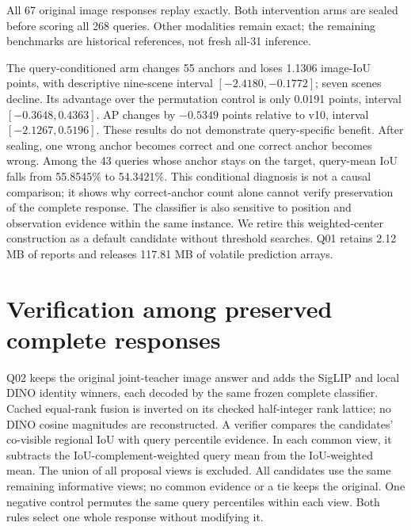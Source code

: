 \documentclass[10pt]{article}
\begin{document}
All 67 original image responses replay exactly. Both intervention arms are
sealed before scoring all 268 queries. Other modalities remain exact; the
remaining benchmarks are historical references, not fresh all-31 inference.
\begin{table}[ht]
\centering\small

\caption{Q01: targeted identity-conditioning control on the opened development
cohort. No arm is promoted. Actual selections are re-evaluated.}
\end{table}

The query-conditioned arm changes 55 anchors and loses 1.1306 image-IoU points,
with descriptive nine-scene interval $[-2.4180,-0.1772]$; seven scenes decline.
Its advantage over the permutation control is only 0.0191 points, interval
$[-0.3648,0.4363]$. AP changes by $-0.5349$ points relative to v10, interval
$[-2.1267,0.5196]$. These results do not demonstrate query-specific benefit.
After sealing, one wrong anchor becomes correct and one correct anchor becomes
wrong. Among the 43 queries whose anchor stays on the target, query-mean IoU
falls from 55.8545\% to 54.3421\%. This conditional diagnosis is not a causal
comparison; it shows why correct-anchor count alone cannot verify preservation
of the complete response. The classifier is also sensitive to position and
observation evidence within the same instance. We retire this weighted-center
construction as a default candidate without threshold searches. Q01 retains
2.12 MB of reports and releases 117.81 MB of volatile prediction arrays.

\section{Verification among preserved complete responses}
Q02 keeps the original joint-teacher image answer and adds the SigLIP and local
DINO identity winners, each decoded by the same frozen complete classifier.
Cached equal-rank fusion is inverted on its checked half-integer rank lattice;
no DINO cosine magnitudes are reconstructed. A verifier compares the candidates'
co-visible regional IoU with query percentile evidence. In each common view,
it subtracts the IoU-complement-weighted query mean from the IoU-weighted mean.
The union of all proposal views is excluded. All candidates use the same
remaining informative views; no common evidence or a tie keeps the original.
One negative control permutes the same query percentiles within each view.
Both rules select one whole response without modifying it.
\end{document}
